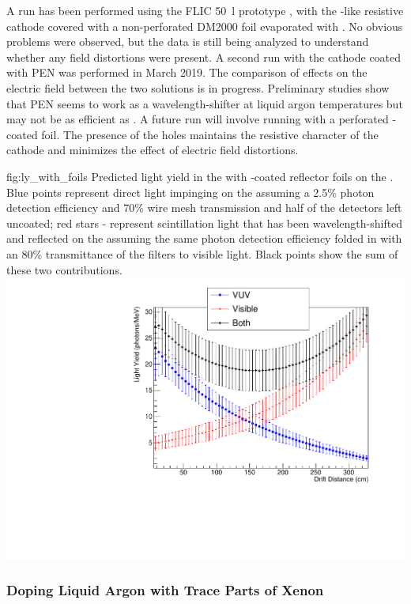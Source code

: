 A run has been performed using the  FLIC \SI{50}{l} prototype , with
the -like resistive cathode covered with a non-perforated DM2000
foil evaporated with . No obvious  problems were observed, but 
the data is still being analyzed to understand whether any field
distortions were present.  A second run with the cathode coated with PEN
was performed in March 2019. The comparison of effects on the electric field between the two solutions is in progress. Preliminary studies show that PEN seems to work as a wavelength-shifter at liquid argon temperatures but may not be as efficient as . A future run will involve running with a perforated -coated foil. The presence of the holes maintains the resistive character of the cathode and minimizes the effect of electric field distortions. 



\begin{dunefigure}{fig:ly_with_foils}
{Predicted light yield in the  with -coated reflector foils on the . Blue points represent direct  light impinging on the  assuming a 2.5\% photon detection efficiency and 70\% wire mesh transmission and half of the detectors left uncoated; red stars - represent scintillation light that has been wavelength-shifted and reflected on the  assuming the same photon detection efficiency folded in with an 80\% transmittance of the filters to visible light. Black points show the sum of these two contributions.}
\includegraphics[width=0.5\columnwidth]{graphics/pds-ly_with_foils_new.pdf}
\end{dunefigure}

\subsubsection{Doping Liquid Argon with Trace Parts of Xenon}
\label{sec:fdsp-pd-enh-xenon}


